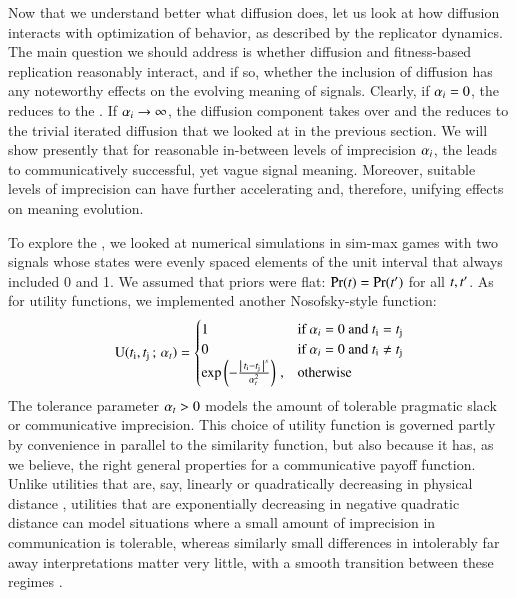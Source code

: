 Now that we understand better what diffusion does, let us look at how
diffusion interacts with optimization of behavior, as described by the
replicator dynamics. The main question we should address is whether
diffusion and fitness-based replication reasonably interact, and if
so, whether the inclusion of diffusion has any noteworthy effects on
the evolving meaning of signals. Clearly, if $\alpha_i = 0$, the
\rdd reduces to the \rd. If $\alpha_i \rightarrow \infty$, the
diffusion component takes over and the \rdd reduces to the trivial
iterated diffusion that we looked at in the previous section. We will
show presently that for reasonable in-between levels of imprecision
$\alpha_i$, the \rdd leads to communicatively successful, yet vague
signal meaning. Moreover, suitable levels of imprecision can have
further accelerating and, therefore, unifying effects on meaning
evolution.

To explore the \rdd, we looked at numerical simulations in sim-max
games with two signals whose states were evenly spaced elements of the
unit interval that always included 0 and 1. We assumed that priors
were flat: $\Pr(t) = \Pr(t')$ for all $t, t'$. As
for utility functions, we implemented another Nosofsky-style function:
\begin{align}
  \label{eq:NosofskyUtil}
  \mathrm{U}(t_{\mathrm{i}}, t_{\mathrm{j}} \thinspace ; \thinspace \alpha_t) =
      \begin{cases}
    1 & \textrm{if } \alpha_i = 0 \textrm{ and } t_{\mathrm{i}} = t_{\mathrm{j}} \\
    0 & \textrm{if } \alpha_i = 0 \textrm{ and } t_{\mathrm{i}} \neq t_{\mathrm{j}} \\
 \operatorname{exp} \left ( -  \frac{\left \lvert \, t_{\mathrm{i}} - t_{\mathrm{j}} \, \right\rvert^s}{ \alpha_t^2} \right ) \,,& \textrm{otherwise} \\
    \end{cases}
\end{align}
The tolerance parameter $\alpha_t > 0$ models the amount of tolerable
pragmatic slack or communicative imprecision. This choice of utility
function is governed partly by convenience in parallel to the
similarity function, but also because it has, as we believe, the right
general properties for a communicative payoff function. Unlike
utilities that are, say, linearly or quadratically decreasing in
physical distance \citep[as used
by][]{JagerMetzger2011:Voronoi-Languag,FrankeJager2010:Vagueness-Signa},
utilities that are exponentially decreasing in negative quadratic
distance can model situations where a small amount of imprecision in
communication is tolerable, whereas similarly small differences in
intolerably far away interpretations matter very little, with a smooth
transition between these regimes
\citep[c.f.][]{OConnor2013:The-Evolution-o}.

